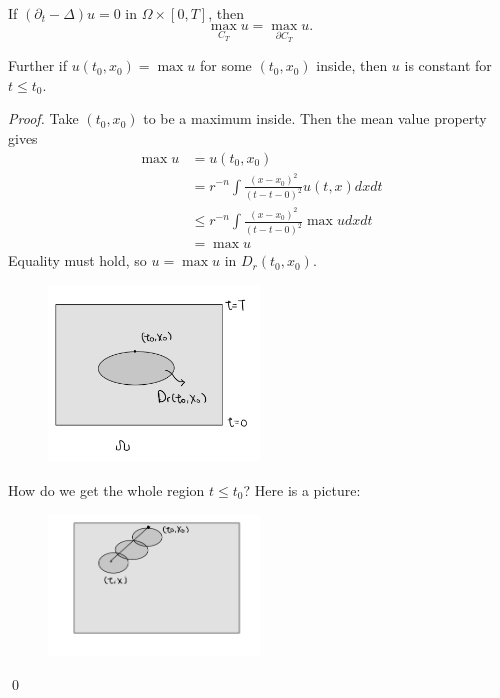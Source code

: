 \begin{theorem}
If $\left(\partial_{t}-\Delta\right) u=0$ in $\Omega \times[0, T]$, then 
$$
\max _{C_{T}} u=\max _{\partial C_{T}} u.
$$

Further if $u\left(t_{0}, x_{0}\right)=\max u$ for some $\left(t_{0}, x_{0}\right)$ inside, then $u$ is constant for $t \leq t_{0}.$
\end{theorem}
\begin{proof}
    Take $\left(t_{0}, x_{0}\right)$ to be a maximum inside. Then the mean value property gives
    $$
    \begin{aligned}
    \max u &=u\left(t_{0}, x_{0}\right) \\
    &=r^{-n} \int \frac{\left(x-x_{0}\right)^{2}}{(t-t-0)^{2}} u(t, x) d x d t \\
    & \leq r^{-n} \int \frac{\left(x-x_{0}\right)^{2}}{(t-t-0)^{2}} \max u d x d t \\
    &=\max u
    \end{aligned}
    $$
    Equality must hold, so $u=\max u$ in $D_r(t_0, x_0)$.
    \begin{figure}[H]
        \centering
        \includegraphics[width=0.5\textwidth]{pics/24-3.png}
\end{figure}
How do we get the whole region ${t\le t_0}$? Here is a picture: 
\begin{figure}[H]
    \centering
    \includegraphics[width=0.5\textwidth]{pics/24-4.png}
\end{figure}
\qed 
\end{proof}

